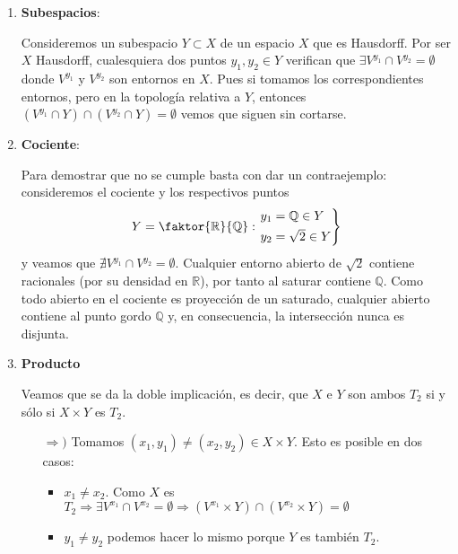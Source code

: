 \begin{demo}
\begin{enumerate}
    \item \textbf{Subespacios}:
    
    Consideremos un subespacio $Y\subset X$ de un espacio $X$ que es Hausdorff. Por ser $X$ Hausdorff, cualesquiera dos puntos $y_1, y_2 \in Y$ verifican que $\exists V^{y_1} \cap V^{y_2} = \emptyset$ donde $V^{y_1}$ y $V^{y_2}$ son entornos en $X$. Pues si tomamos los correspondientes entornos, pero en la topología relativa a $Y$, entonces $\left( V^{y_1} \cap Y \right) \cap \left( V^{y_2} \cap Y \right) = \emptyset$ vemos que siguen sin cortarse.

    \item \textbf{Cociente}:
    
    Para demostrar que no se cumple basta con dar un contraejemplo: consideremos el cociente y los respectivos puntos
\[
Y = \faktor{\mathbb{R}}{\mathbb{Q}}: \begin{rcases}
        y_1 = \mathbb{Q} \in Y\\
        y_2 = \sqrt{2} \in Y
    \end{rcases}
\]
y veamos que $\nexists V^{y_1} \cap V^{y_2} = \emptyset$. Cualquier entorno abierto de $\sqrt{2}$ contiene racionales (por su densidad en $\mathbb{R}$), por tanto al saturar contiene $\mathbb{Q}$. Como todo abierto en el cociente es proyección de un saturado, cualquier abierto contiene al punto gordo $\mathbb{Q}$ y, en consecuencia, la intersección nunca es disjunta.

    \item \textbf{Producto}
    
    Veamos que se da la doble implicación, es decir, que $X$ e $Y$ son ambos $T_2$ si y sólo si $X \times Y$ es $T_2$.
    \begin{itemize}
        \item[$\Rightarrow)$] Tomamos $\left( x_1, y_1 \right) \neq \left( x_2, y_2 \right) \in X \times Y$. Esto es posible en dos casos:
        \begin{itemize}
            \item $x_1 \neq x_2$. Como $X$ es $T_2 \Rightarrow \exists V^{x_1} \cap V^{x_2} = \emptyset \Rightarrow \left( V^{x_1} \times Y \right) \cap \left( V^{x_2} \times Y \right) = \emptyset$ 
            \item $y_1 \neq y_2$ podemos hacer lo mismo porque $Y$ es también $T_2$.
        \end{itemize}


\end{itemize}
\end{enumerate}
\end{demo}
